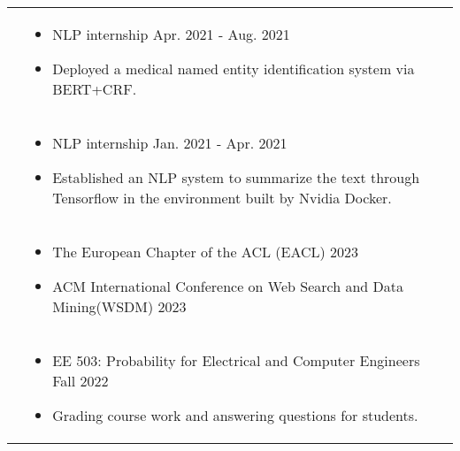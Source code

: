 \documentclass[letterpaper, 10pt]{article}
\begin{document}
\begin{longtable}{p{1.3in}p{4.8in}}
  

&  \begin{itemize}[leftmargin=10pt, itemsep=-5pt, topsep=0pt,before=\textbf{Umer Technology}]
    \item NLP internship \hfill Apr. 2021 - Aug. 2021 
    \item  Deployed a medical named entity identification system via BERT+CRF.
  \end{itemize}\\ 

&  \begin{itemize}[leftmargin=10pt, itemsep=-5pt, topsep=0pt,before=\textbf{Transwarp}]
    \item NLP internship \hfill Jan. 2021 - Apr. 2021 
    \item  Established an NLP system to summarize the text through Tensorflow in the environment built by Nvidia Docker.
  \end{itemize}\\ 


{\color{black}{Professional service}}
&  \begin{itemize}[leftmargin=10pt,topsep=0pt,before=\textbf{Program Committee}]
    \item The European Chapter of the ACL (EACL) 2023
    \item ACM International Conference on Web Search and Data Mining(WSDM) 2023
  \end{itemize}\\ 



{\color{black}{Teaching Experience}} 
&  \begin{itemize}[leftmargin=10pt, itemsep=-5pt, topsep=0pt,before=\textbf{Teaching assistant, University of Southern California}]
    \item EE 503: Probability for Electrical and Computer Engineers \hfill Fall 2022
    \item  Grading course work and answering questions for students.
  \end{itemize}\\ 



\end{longtable}
\end{document}
